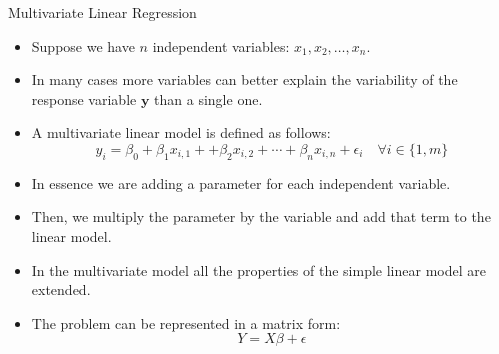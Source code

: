 \documentclass[handout]{beamer}
\begin{document}
\begin{frame}{Multivariate Linear Regression}
\scriptsize{
\begin{itemize}
 \item Suppose we have $n$ independent variables:  $x_1,x_2,\dots,x_n$.
 \item In many cases more variables can better explain the variability of the response variable $\mathbf{y}$ than a single one.
 \item A multivariate linear model is defined as follows:
 \begin{displaymath}
 y_i=\beta_{0}+\beta_{1}x_{i,1}+ +\beta_{2}x_{i,2} + \cdots + \beta_{n}x_{i,n} +  \epsilon_i \quad \forall i \in \{1,m\}
\end{displaymath}

\item In essence we are adding a parameter for each independent variable.

\item Then, we multiply the parameter by the variable and add that term to the linear model.

\item  In the multivariate model all the properties of the simple linear model are extended.

\item The problem can be represented in a matrix form:
\begin{displaymath}
 Y=X\beta+\epsilon
\end{displaymath}








\end{itemize}
 

}
\end{frame}
\end{document}
